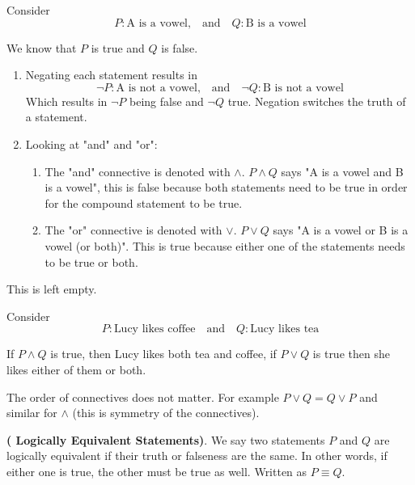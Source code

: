 \begin{example}
    Consider
    $$
    P: \text{A is a vowel,} \quad \text{and} \quad Q: \text{B is a vowel}
    $$

    We know that $P$ is true and $Q$ is false.

    \begin{enumerate}
        \item Negating each statement results in
            $$
            \neg P: \text{A is not a vowel,} \quad \text{and} \quad \neg Q: \text{B is not a vowel}
            $$
            Which results in $\neg P$ being false and $\neg Q$ true. Negation switches the truth of a statement.
        \item Looking at "and" and "or":
            \begin{enumerate}[label=(\alph*)]
                \item The "and" connective is denoted with $\land$. $P \land Q$ says "A is a vowel and B is a vowel", this is false because both statements need to be true in order for the compound statement to be true.
                \item The "or" connective is denoted with $\lor$. $P \lor Q$ says "A is a vowel or B is a vowel (or both)". This is true because either one of the statements needs to be true or both.
            \end{enumerate}
    \end{enumerate}
\end{example}

\begin{remark}
    This is left empty.
\end{remark}

\begin{example}
    Consider
    $$
    P: \text{Lucy likes coffee} \quad \text{and} \quad Q: \text{Lucy likes tea}
    $$

    If $P \land Q$ is true, then Lucy likes both tea and coffee, if $P \lor Q$ is true then she likes either of them or both.
\end{example}

The order of connectives does not matter. For example $P \lor Q = Q \lor P$ and similar for $\land$ (this is symmetry of the connectives).

\begin{definition} \textbf{( Logically Equivalent Statements)}. We say two statements $P$ and $Q$ are logically equivalent if their truth or falseness are the same. In other words, if either one is true, the other must be true as well. Written as $P \equiv Q$.
\end{definition}

